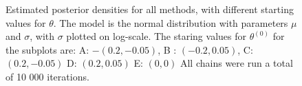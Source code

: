 \begin{figure}
    \caption{Estimated posterior densities for all methods, with different starting values for $\theta$. The model is the normal distribution with parameters $\mu$ and $\sigma$, with $\sigma$ plotted on log-scale. The staring values for  $\theta^{\left(0\right)}$ for the subplots are:   A: $-(0.2, -0.05)$, B : $(-0.2, 0.05)$, C: $(0.2, -0.05)$ D: $(0.2, 0.05)$ E: $(0,0)$ All chains were run a total of 10 000 iterations.}%
    \label{fig:density_10k_04_06_normal}%
\end{figure}





